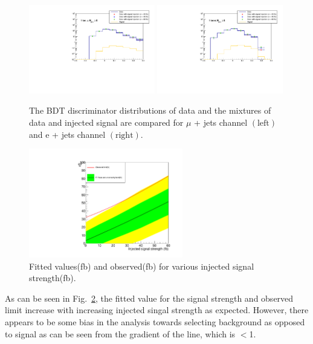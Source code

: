 \begin{figure}[ht!]
    \includegraphics[width=0.49\textwidth]{images/Run1/SignalInjection_Mu_8j.pdf}
     \includegraphics[width=0.49\textwidth]{images/Run1/SignalInjection_El_8j.pdf}          
    \caption{The BDT discriminator distributions of data and the mixtures of data and injected signal are compared for $\mu$ + jets channel $\left( \textrm{left} \right)$ and e + jets channel $\left( \textrm{right} \right)$. }
    \label{fig:SigInjection}
\end{figure}

\begin{figure}[!ht]
\centering
    \includegraphics[width=0.6\textwidth]{images/Run1/SignalInjection_JS_Brazil.pdf}
    \caption{Fitted values(fb) and observed(fb) for various injected signal strength(fb).}
    \label{fig:SigInjectionBrazil}
\end{figure}

As can be seen in Fig.~\ref{fig:SigInjectionBrazil}, the fitted value for the signal strength and observed limit increase with increasing injected singal strength as expected. However, there appears to be some bias in the analysis towards selecting background as opposed to signal as can be seen from the gradient of the line, which is $<$1.


